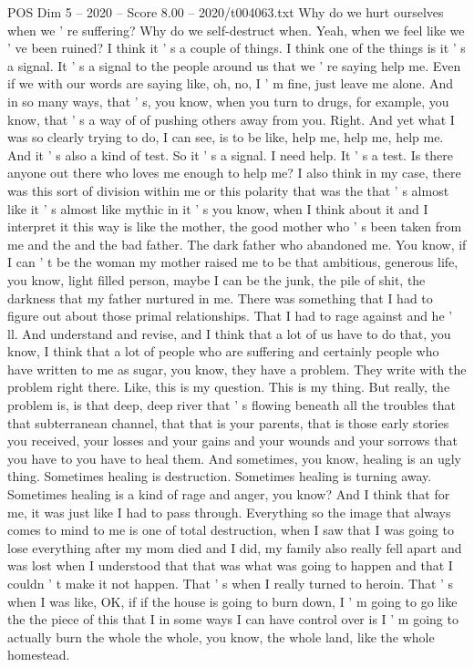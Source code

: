 \begin{textsample}{POS Dim 5 – 2020 – Score 8.00 – 2020/t004063.txt}
Why do we hurt ourselves when we ' re suffering?
Why do we self-destruct when.
Yeah, when we feel like we ' ve been ruined?
I think it ' s a couple of things.
I think one of the things is it ' s a signal.
It ' s a signal to the people around us that we ' re saying help me.
Even if we with our words are saying like, oh, no, I ' m fine, just leave me alone.
And in so many ways, that ' s, you know, when you turn to drugs, for example, you know, that ' s a way of of pushing others away from you.
Right.
And yet what I was so clearly trying to do, I can see, is to be like, help me, help me, help me.
And it ' s also a kind of test.
So it ' s a signal.
I need help.
It ' s a test.
Is there anyone out there who loves me enough to help me?
I also think in my case, there was this sort of division within me or this polarity that was the that ' s almost like it ' s almost like mythic in it ' s you know, when I think about it and I interpret it this way is like the mother, the good mother who ' s been taken from me and the and the bad father.
The dark father who abandoned me.
You know, if I can ' t be the woman my mother raised me to be that ambitious, generous life, you know, light filled person, maybe I can be the junk, the pile of shit, the darkness that my father nurtured in me.
There was something that I had to figure out about those primal relationships.
That I had to rage against and he ' ll.
And understand and revise, and I think that a lot of us have to do that, you know, I think that a lot of people who are suffering and certainly people who have written to me as sugar, you know, they have a problem.
They write with the problem right there.
Like, this is my question.
This is my thing.
But really, the problem is, is that deep, deep river that ' s flowing beneath all the troubles that that subterranean channel, that that is your parents, that is those early stories you received, your losses and your gains and your wounds and your sorrows that you have to you have to heal them.
And sometimes, you know, healing is an ugly thing.
Sometimes healing is destruction.
Sometimes healing is turning away.
Sometimes healing is a kind of rage and anger, you know?
And I think that for me, it was just like I had to pass through.
Everything so the image that always comes to mind to me is one of total destruction, when I saw that I was going to lose everything after my mom died and I did, my family also really fell apart and was lost when I understood that that was what was going to happen and that I couldn ' t make it not happen.
That ' s when I really turned to heroin.
That ' s when I was like, OK, if if the house is going to burn down, I ' m going to go like the the piece of this that I in some ways I can have control over is I ' m going to actually burn the whole the whole, you know, the whole land, like the whole homestead.

\end{textsample}
